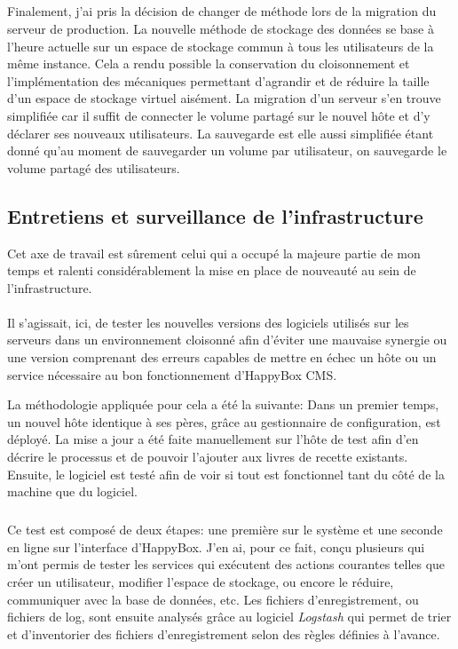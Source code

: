 \documentclass[11pt, a4paper ]{article}
\begin{document}
\begin{spacing}{1.5}
\subparagraph{}
Finalement, j'ai pris la décision de changer de méthode lors de la migration du serveur de production. La nouvelle méthode de stockage des données se base à l'heure actuelle sur un espace de stockage commun à tous les utilisateurs de la même instance. Cela a rendu possible la conservation du cloisonnement et l'implémentation des mécaniques permettant d'agrandir et de réduire la taille d'un espace de stockage virtuel aisément. La migration d'un serveur s'en trouve simplifiée car il suffit de connecter le volume partagé sur le nouvel hôte et d'y déclarer ses nouveaux utilisateurs. La sauvegarde est elle aussi simplifiée étant donné qu'au moment de sauvegarder un volume par utilisateur, on sauvegarde le volume partagé des utilisateurs.


\subsection{Entretiens et surveillance de l'infrastructure}

Cet axe de travail est sûrement celui qui a occupé la majeure partie de mon temps et ralenti considérablement la mise en place de nouveauté au sein de l'infrastructure.

\paragraph{}
Il s'agissait, ici, de tester les nouvelles versions des logiciels utilisés sur les serveurs dans un environnement cloisonné afin d'éviter une mauvaise synergie ou une version comprenant des erreurs capables de mettre en échec un hôte ou un service nécessaire au bon fonctionnement d'HappyBox CMS.

La méthodologie appliquée pour cela a été la suivante:
Dans un premier temps, un nouvel hôte identique à ses pères, grâce au gestionnaire de configuration, est déployé. La mise a jour a été faite manuellement sur l'hôte de test afin d'en décrire le processus et de pouvoir l'ajouter aux livres de recette existants.
Ensuite, le logiciel est testé afin de voir si tout est fonctionnel tant du côté de la machine que du logiciel.

\subparagraph{}
Ce test est composé de deux étapes: une première sur le système et une seconde en ligne sur l'interface d'HappyBox. J'en ai, pour ce fait, conçu plusieurs qui m'ont permis de tester les services qui exécutent des actions courantes telles que créer un utilisateur, modifier l'espace de stockage, ou encore le réduire, communiquer avec la base de données, etc.
Les fichiers d’enregistrement, ou fichiers de log, sont ensuite analysés grâce au logiciel \emph{Logstash} qui permet de trier et d'inventorier des fichiers d'enregistrement selon des règles définies à l'avance.


\end{spacing}
\end{document}
